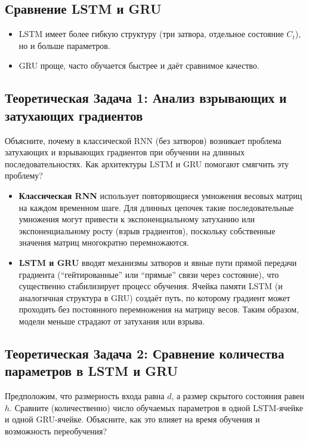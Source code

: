 \subsection{Сравнение LSTM и GRU}
\begin{itemize}
	\item LSTM имеет более гибкую структуру (три затвора, отдельное состояние $C_t$), но и больше параметров.
	\item GRU проще, часто обучается быстрее и даёт сравнимое качество.
\end{itemize}


\subsection{Теоретическая Задача 1: Анализ взрывающих и затухающих градиентов}
Объясните, почему в классической RNN (без затворов) возникает проблема затухающих и взрывающих градиентов при обучении на длинных последовательностях. Как архитектуры LSTM и GRU помогают смягчить эту проблему?

\begin{itemize}
	\item \textbf{Классическая RNN} использует повторяющиеся умножения весовых матриц на каждом временном шаге. Для длинных цепочек такие последовательные умножения могут привести к экспоненциальному затуханию или экспоненциальному росту (взрыв градиентов), поскольку собственные значения матриц многократно перемножаются.
	\item \textbf{LSTM и GRU} вводят механизмы затворов и явные пути прямой передачи градиента (``гейтированные'' или ``прямые'' связи через состояние), что существенно стабилизирует процесс обучения. Ячейка памяти LSTM (и аналогичная структура в GRU) создаёт путь, по которому градиент может проходить без постоянного перемножения на матрицу весов. Таким образом, модели меньше страдают от затухания или взрыва.
\end{itemize}

\subsection{Теоретическая Задача 2: Сравнение количества параметров в LSTM и GRU}
Предположим, что размерность входа равна $d$, а размер скрытого состояния равен $h$. Сравните (количественно) число обучаемых параметров в одной LSTM-ячейке и одной GRU-ячейке. Объясните, как это влияет на время обучения и возможность переобучения?

